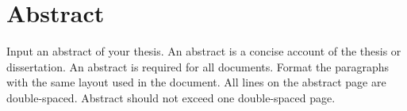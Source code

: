 \section*{Abstract}
Input an abstract of your thesis. An abstract is a concise account of the thesis or dissertation. An abstract is required for all documents. Format the paragraphs with the same layout used in the document. All lines on the abstract page are double-spaced. Abstract should not exceed one double-spaced page.